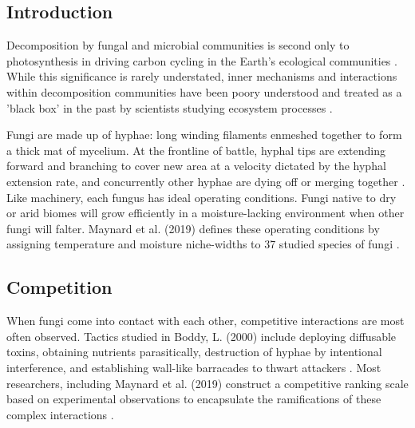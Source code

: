 \documentclass[12pt]{article}
\begin{document}
\clearpage
\begin{multicols}{2}
\tableofcontents
\listoftables
\listoffigures
\newpage
\pagestyle{fancy}
\newpage
\setcounter{page}{1}


	
	
\section{Introduction}

Decomposition by fungal and microbial communities is second only to photosynthesis in driving carbon cycling in the Earth's ecological communities \cite{McGuire2010}. While this significance is rarely understated, inner mechanisms and interactions within decomposition communities have been poory understood and treated as a 'black box' in the past by scientists studying ecosystem processes \cite{Andren1999}.

Fungi are made up of hyphae: long winding filaments enmeshed together to form a thick mat of mycelium. At the frontline of battle, hyphal tips are extending forward and branching to cover new area at a velocity dictated by the hyphal extension rate, and concurrently other hyphae are dying off or merging together \cite{Edelstein1982}. Like machinery, each fungus has ideal operating conditions. Fungi native to dry or arid biomes will grow efficiently in a moisture-lacking environment when other fungi will falter. Maynard et al. (2019) defines these operating conditions by assigning temperature and moisture niche-widths to 37 studied species of fungi \cite{Maynard2019}.

\subsection{Competition}
When fungi come into contact with each other, competitive interactions are most often observed. Tactics studied in Boddy, L. (2000) include deploying diffusable toxins, obtaining nutrients parasitically, destruction of hyphae by intentional interference, and establishing wall-like barracades to thwart attackers \cite{Boddy2000}. Most researchers, including Maynard et al. (2019) construct a competitive ranking scale based on experimental observations to encapsulate the ramifications of these complex interactions \cite{Maynard2019}.


\end{multicols}
\end{document}
